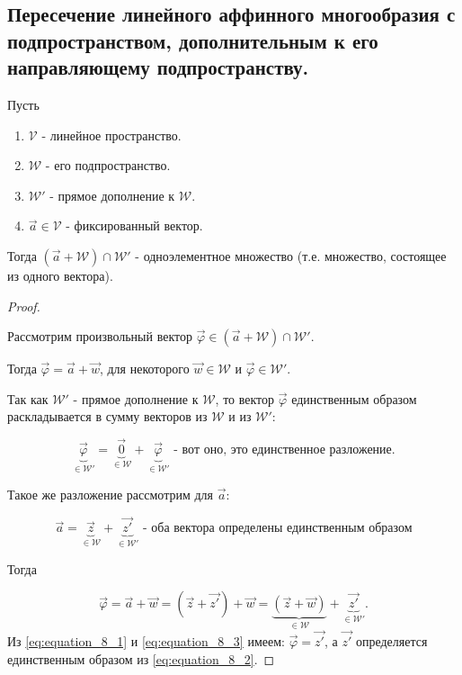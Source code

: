 \subsection{
    Пересечение линейного аффинного многообразия с подпространством, дополнительным к его направляющему подпространству.
}

\begin{theorem}
    Пусть
    \begin{enumerate}
        \item $\mathcal{V}$ - линейное пространство.
        \item $\mathcal{W}$ - его подпространство.
        \item $\mathcal{W'}$ - прямое дополнение к $\mathcal{W}$.
        \item $\vec{a} \in \mathcal{V}$ - фиксированный вектор.
    \end{enumerate}
    Тогда $(\vec{a} + \mathcal{W}) \cap \mathcal{W}'$ - одноэлементное множество (т.е. множество, состоящее из одного вектора).
\end{theorem}

\begin{proof}~

    Рассмотрим произвольный вектор $\vec{\varphi} \in (\vec{a} + \mathcal{W}) \cap \mathcal{W}'$. 
    
    Тогда $\vec{\varphi} = \vec{a} + \vec{w}$, для некоторого $\vec{w} \in \mathcal{W}$ и $\vec{\varphi} \in \mathcal{W}'$.

    Так как $\mathcal{W}'$ - прямое дополнение к $\mathcal{W}$, то вектор $\vec{\varphi}$ единственным образом раскладывается в сумму векторов из $\mathcal{W}$ и из $\mathcal{W}'$:

    \begin{equation}
        \underbrace{\vec{\varphi}}_{\in \mathcal{W'}} = \underbrace{\vec{0}}_{\in \mathcal{W}} + \underbrace{\vec{\varphi}}_{\in \mathcal{W'}}\text{ - вот оно, это единственное разложение.}
        \label{eq:equation_8_1}
    \end{equation}

    Такое же разложение рассмотрим для $\vec{a}$:

    \begin{equation}
        \vec{a} = \underbrace{\vec{z}}_{\in \mathcal{W}} + \underbrace{\vec{z'}}_{\in \mathcal{W}'}\text{ - оба вектора определены единственным образом}
        \label{eq:equation_8_2}
    \end{equation}
    
    Тогда 

    \begin{equation}
        \vec{\varphi} = \vec{a} + \vec{w} = (\vec{z} + \vec{z'}) + \vec{w} = \underbrace{(\vec{z} + \vec{w})}_{\in \mathcal{W}} + \underbrace{\vec{z'}}_{\in \mathcal{W}'}.
        \label{eq:equation_8_3}
    \end{equation}
    Из \eqref{eq:equation_8_1} и \eqref{eq:equation_8_3} имеем: $\vec{\varphi} = \vec{z'}$, а $\vec{z'}$ определяется единственным образом из \eqref{eq:equation_8_2}.
\end{proof}
